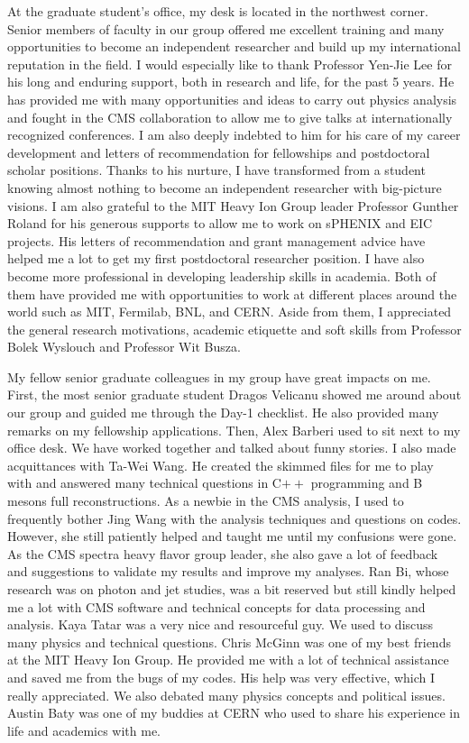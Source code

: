 At the graduate student's office, my desk is located in the northwest corner. Senior members of faculty in our group offered me excellent training and many opportunities to become an independent researcher and build up my international reputation in the field. I would especially like to thank Professor Yen-Jie Lee for his long and enduring support, both in research and life, for the past 5 years. He has provided me with many opportunities and ideas to carry out physics analysis and fought in the CMS collaboration to allow me to give talks at internationally recognized conferences. I am also deeply indebted to him for his care of my career development and letters of recommendation for fellowships and postdoctoral scholar positions. Thanks to his nurture, I have transformed from a student knowing almost nothing to become an independent researcher with big-picture visions. I am also grateful to the MIT Heavy Ion Group leader Professor Gunther Roland for his generous supports to allow me to work on sPHENIX and EIC projects. His letters of recommendation and grant management advice have helped me a lot to get my first postdoctoral researcher position. I have also become more professional in developing leadership skills in academia. Both of them have provided me with opportunities to work at different places around the world such as MIT, Fermilab, BNL, and CERN. Aside from them, I appreciated the general research motivations, academic etiquette and soft skills from Professor Bolek Wyslouch and Professor Wit Busza.


My fellow senior graduate colleagues in my group have great impacts on me. First, the most senior graduate student Dragos Velicanu showed me around about our group and guided me through the Day-1 checklist. He also provided many remarks on my fellowship applications. Then, Alex Barberi used to sit next to my office desk. We have worked together and talked about funny stories. I also made acquittances with Ta-Wei Wang. He created the skimmed files for me to play with and answered many technical questions in C$++$ programming and B mesons full reconstructions. As a newbie in the CMS analysis, I used to frequently bother Jing Wang with the analysis techniques and questions on codes. However, she still patiently helped and taught me until my confusions were gone. As the CMS spectra heavy flavor group leader, she also gave a lot of feedback and suggestions to validate my results and improve my analyses. Ran Bi, whose research was on photon and jet studies, was a bit reserved but still kindly helped me a lot with CMS software and technical concepts for data processing and analysis. Kaya Tatar was a very nice and resourceful guy. We used to discuss many physics and technical questions. Chris McGinn was one of my best friends at the MIT Heavy Ion Group. He provided me with a lot of technical assistance and saved me from the bugs of my codes. His help was very effective, which I really appreciated. We also debated many physics concepts and political issues. Austin Baty was one of my buddies at CERN who used to share his experience in life and academics with me.  

